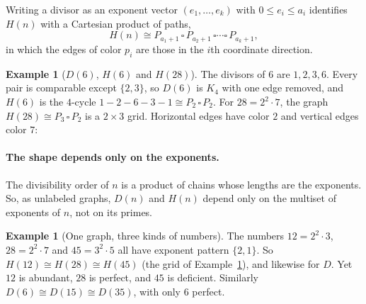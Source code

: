\documentclass[11pt]{article}
\theoremstyle{definition}
\newtheorem{example}[theorem]{Example}
\theoremstyle{remark}
\begin{document}
Writing a divisor as an exponent vector $(e_1,\dots,e_k)$ with
$0\le e_i\le a_i$ identifies $H(n)$ with a Cartesian product of paths,
\[
H(n)\cong P_{a_1+1}\,\square\,P_{a_2+1}\,\square\cdots\square\,P_{a_k+1},
\]
in which the edges of color $p_i$ are those in the $i$th coordinate
direction.

\begin{example}[$D(6)$, $H(6)$ and $H(28)$]\label{ex:divisor28}
The divisors of $6$ are $1,2,3,6$.  Every pair is comparable except
$\{2,3\}$, so $D(6)$ is $K_4$ with one edge removed, and $H(6)$ is the
$4$-cycle $1-2-6-3-1\cong P_2\,\square\,P_2$.  For $28=2^2\cdot7$, the
graph $H(28)\cong P_3\,\square\,P_2$ is a $2\times3$ grid.  Horizontal edges
have color $2$ and vertical edges color $7$:
\begin{center}
\end{center}
\end{example}

\paragraph{The shape depends only on the exponents.}
The divisibility order of $n$ is a product of chains whose lengths are the
exponents.  So, as unlabeled graphs, $D(n)$ and $H(n)$ depend only on the
multiset of exponents of $n$, not on its primes.

\begin{example}[One graph, three kinds of numbers]\label{ex:onegraph}
The numbers $12=2^2\cdot3$, $28=2^2\cdot7$ and $45=3^2\cdot5$ all have
exponent pattern $\{2,1\}$.  So $H(12)\cong H(28)\cong H(45)$ (the grid of
Example~\ref{ex:divisor28}), and likewise for $D$.  Yet $12$ is abundant,
$28$ is perfect, and $45$ is deficient.  Similarly
$D(6)\cong D(15)\cong D(35)$, with only $6$ perfect.
\end{example}
\end{document}
